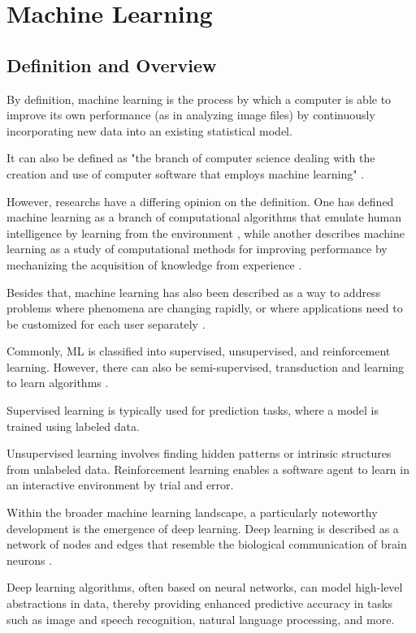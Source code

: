
\newpage
\section{Machine Learning}
\subsection{Definition and Overview}
By definition, machine learning is the process by which a computer is able to improve its own performance (as in analyzing image files) by continuously incorporating new data into an existing statistical model. 

It can also be defined as "the branch of computer science dealing with the creation and use of computer software that employs machine learning" \parencite{mw:machine-learning}.

However, researchs have a differing opinion on the definition. One has defined machine learning as a branch of computational algorithms that emulate human intelligence by learning from the environment \parencite{ElNaqa2015}, while another describes machine learning as a study of computational methods for improving performance by mechanizing the acquisition of knowledge from experience \parencite{Langley1995}. 

Besides that, machine learning has also been described as a way to address problems where phenomena are changing rapidly, or where applications need to be customized for each user separately \parencite{Dietterich1996}.

Commonly, ML is classified into supervised, unsupervised, and reinforcement learning. However, there can also be semi-supervised, transduction and learning to learn algorithms \parencite{Oladipupo2010}. 

Supervised learning is typically used for prediction tasks, where a model is trained using labeled data. 

Unsupervised learning involves finding hidden patterns or intrinsic structures from unlabeled data. Reinforcement learning enables a software agent to learn in an interactive environment by trial and error.

Within the broader machine learning landscape, a particularly noteworthy development is the emergence of deep learning. Deep learning is described as a network of nodes and edges that resemble the biological communication of brain neurons \parencite{Dinov2018}. 

Deep learning algorithms, often based on neural networks, can model high-level abstractions in data, thereby providing enhanced predictive accuracy in tasks such as image and speech recognition, natural language processing, and more.

